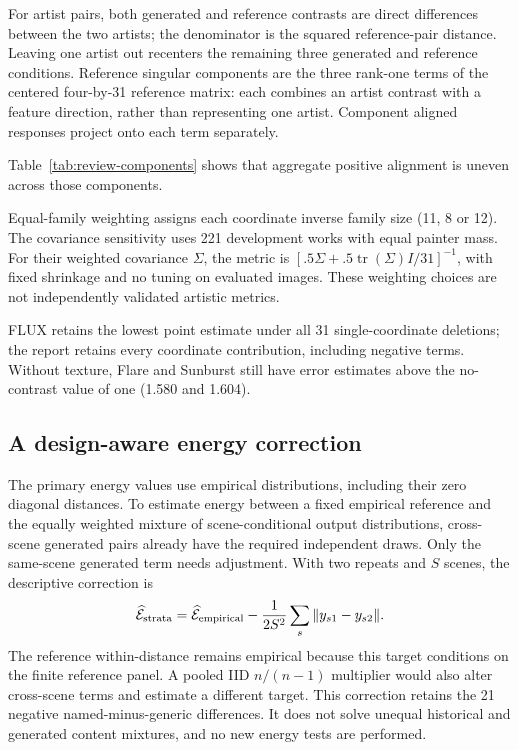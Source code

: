 

For artist pairs, both generated and reference contrasts are direct differences
between the two artists; the denominator is the squared reference-pair distance.
Leaving one artist out recenters the remaining three generated and reference
conditions. Reference singular components are the three rank-one terms of the
centered four-by-31 reference matrix: each combines an artist contrast with a
feature direction, rather than representing one artist. Component aligned
responses project onto each term separately.



Table~\ref{tab:review-components} shows that aggregate positive alignment is
uneven across those components.

Equal-family weighting assigns each coordinate inverse family size (11, 8 or 12).
The covariance sensitivity uses 221 development works with equal painter mass.
For their weighted covariance $\Sigma$, the metric is
$[.5\Sigma+.5\operatorname{tr}(\Sigma)I/31]^{-1}$, with fixed shrinkage and no
tuning on evaluated images. These weighting choices are not independently
validated artistic metrics.

\begin{samepage}
FLUX retains the lowest point estimate under all
31 single-coordinate deletions; the report retains every coordinate contribution,
including negative terms.
Without texture, Flare and Sunburst still have error estimates above the
no-contrast value of one (1.580 and 1.604).
\end{samepage}

\subsection{A design-aware energy correction}
The primary energy values use empirical distributions, including their zero
diagonal distances. To estimate energy between a fixed empirical reference
and the equally weighted mixture of scene-conditional output distributions,
cross-scene generated pairs already have the required independent draws.
Only the same-scene generated term needs adjustment. With two repeats and
$S$ scenes, the descriptive correction is
\[
 \widehat{\mathcal E}_{\rm strata}
 =\widehat{\mathcal E}_{\rm empirical}
 -\frac{1}{2S^2}\sum_s\|y_{s1}-y_{s2}\|.
\]
The reference within-distance remains empirical because this target conditions
on the finite reference panel. A pooled IID $n/(n-1)$ multiplier would also
alter cross-scene terms and estimate a different target. This correction retains
the 21 negative named-minus-generic differences. It does not solve unequal
historical and generated content mixtures, and no new energy tests are performed.

